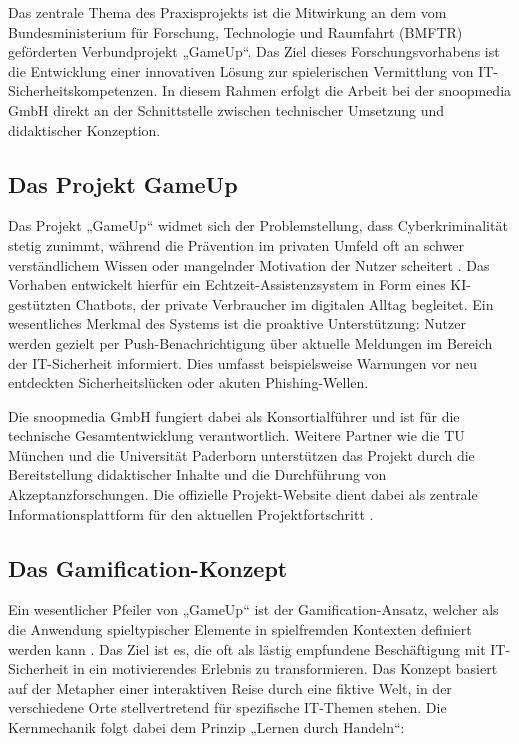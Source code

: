Das zentrale Thema des Praxisprojekts ist die Mitwirkung an dem vom Bundesministerium für Forschung, Technologie und Raumfahrt (BMFTR) \cite{BMFTR} geförderten Verbundprojekt „GameUp“. Das Ziel dieses 
Forschungsvorhabens ist die Entwicklung einer innovativen Lösung zur spielerischen Vermittlung von IT-Sicherheitskompetenzen. In diesem Rahmen erfolgt die Arbeit bei der snoopmedia 
GmbH direkt an der Schnittstelle zwischen technischer Umsetzung und didaktischer Konzeption.

\subsection{Das Projekt GameUp}
Das Projekt „GameUp“ widmet sich der Problemstellung, dass Cyberkriminalität stetig zunimmt, während die Prävention im privaten Umfeld oft an schwer verständlichem Wissen oder 
mangelnder Motivation der Nutzer scheitert \cite{BSI2025}. Das Vorhaben entwickelt hierfür ein Echtzeit-Assistenzsystem in Form eines KI-gestützten Chatbots, der private Verbraucher 
im digitalen Alltag begleitet. Ein wesentliches Merkmal des Systems ist die proaktive Unterstützung: Nutzer werden gezielt per Push-Benachrichtigung über aktuelle Meldungen im Bereich 
der IT-Sicherheit informiert. Dies umfasst beispielsweise Warnungen vor neu entdeckten Sicherheitslücken oder akuten Phishing-Wellen.

Die snoopmedia GmbH fungiert dabei als Konsortialführer und ist für die technische Gesamtentwicklung verantwortlich. Weitere Partner wie die TU München und die Universität Paderborn 
unterstützen das Projekt durch die Bereitstellung didaktischer Inhalte und die Durchführung von Akzeptanzforschungen. Die offizielle Projekt-Website dient dabei als zentrale 
Informationsplattform für den aktuellen Projektfortschritt \cite{gameup2026}.

\subsection{Das Gamification-Konzept}
Ein wesentlicher Pfeiler von „GameUp“ ist der Gamification-Ansatz, welcher als die Anwendung spieltypischer Elemente in spielfremden Kontexten definiert werden kann \cite{Deterding2011}.
Das Ziel ist es, die oft als lästig empfundene Beschäftigung mit IT-Sicherheit in ein motivierendes Erlebnis zu transformieren. Das Konzept basiert auf der Metapher einer 
interaktiven Reise durch eine fiktive Welt, in der verschiedene Orte stellvertretend für spezifische IT-Themen stehen. Die Kernmechanik folgt dabei dem Prinzip „Lernen durch Handeln“:

